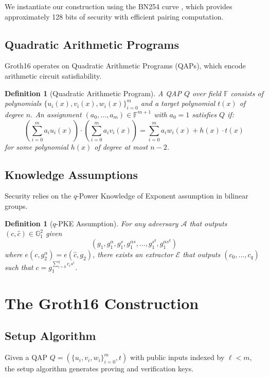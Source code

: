 \documentclass[11pt,a4paper]{article}
\newtheorem{definition}[theorem]{Definition}
\newcommand{\F}{\mathbb{F}}
\newcommand{\G}{\mathbb{G}}
\newcommand{\pair}[2]{e(#1, #2)}
\begin{document}
We instantiate our construction using the BN254 curve \cite{bn254}, which provides approximately 128 bits of security with efficient pairing computation.

\subsection{Quadratic Arithmetic Programs}

Groth16 operates on Quadratic Arithmetic Programs (QAPs), which encode arithmetic circuit satisfiability.

\begin{definition}[Quadratic Arithmetic Program]
A QAP $Q$ over field $\F$ consists of polynomials $\{u_i(x), v_i(x), w_i(x)\}_{i=0}^m$ and a target polynomial $t(x)$ of degree $n$. An assignment $(a_0, \ldots, a_m) \in \F^{m+1}$ with $a_0 = 1$ satisfies $Q$ if:
\[
\left(\sum_{i=0}^m a_i u_i(x)\right) \cdot \left(\sum_{i=0}^m a_i v_i(x)\right) = \sum_{i=0}^m a_i w_i(x) + h(x) \cdot t(x)
\]
for some polynomial $h(x)$ of degree at most $n-2$.
\end{definition}

\subsection{Knowledge Assumptions}

Security relies on the $q$-Power Knowledge of Exponent assumption in bilinear groups.

\begin{definition}[$q$-PKE Assumption]
For any adversary $\mathcal{A}$ that outputs $(c, \hat{c}) \in \G_1^2$ given
\[
(g_1, g_1^\alpha, g_1^s, g_1^{\alpha s}, \ldots, g_1^{s^q}, g_1^{\alpha s^q})
\]
where $\pair{c}{g_2^\alpha} = \pair{\hat{c}}{g_2}$, there exists an extractor $\mathcal{E}$ that outputs $(c_0, \ldots, c_q)$ such that $c = g_1^{\sum_{i=0}^q c_i s^i}$.
\end{definition}

\section{The Groth16 Construction}
\label{sec:groth16}

\subsection{Setup Algorithm}

Given a QAP $Q = (\{u_i, v_i, w_i\}_{i=0}^m, t)$ with public inputs indexed by $\ell < m$, the setup algorithm generates proving and verification keys.
\end{document}
